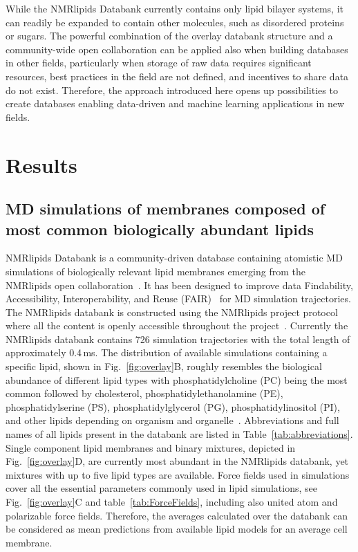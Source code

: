 \documentclass[fleqn,10pt]{wlscirep}
\begin{document}
While the NMRlipids Databank currently contains only lipid bilayer systems, it can readily be expanded to contain other molecules, such as disordered proteins or sugars. The powerful combination of the overlay databank structure and a community-wide open collaboration can be applied also when building databases in other fields, particularly when storage of raw data requires significant resources, best practices in the field are not defined, and incentives to share data do not exist. Therefore, the approach introduced here opens up possibilities to create databases enabling data-driven and machine learning applications in new fields.



\section{Results}

\subsection{MD simulations of membranes composed of most common biologically abundant lipids}

NMRlipids Databank is a community-driven database containing atomistic MD simulations of biologically relevant lipid membranes emerging from the NMRlipids open collaboration~\cite{botan15,ollila16,catte16,antila19,bacle21}. It has been designed to improve data Findability, Accessibility, Interoperability, and Reuse (FAIR)~\cite{wilkinson16} for MD simulation trajectories. The NMRlipids databank is constructed using the NMRlipids project protocol where all the content is openly accessible throughout the project~\cite{botan15}. Currently the NMRlipids databank contains 726 simulation trajectories with the total length of approximately 0.4\,ms. The distribution of available simulations containing a specific lipid, shown in Fig.~\ref{fig:overlay}B, roughly resembles the biological abundance of different lipid types with phosphatidylcholine (PC) being the most common followed by cholesterol, phosphatidylethanolamine (PE), phosphatidylserine (PS), phosphatidylglycerol (PG), phosphatidylinositol (PI), and other lipids depending on organism and organelle~\cite{vanmeer08}. Abbreviations and full names of all lipids present in the databank are listed in Table~\ref{tab:abbreviations}. Single component lipid membranes and binary mixtures, depicted in Fig.~\ref{fig:overlay}D, are currently most abundant in the NMRlipids databank, yet mixtures with up to five lipid types are available. Force fields used in simulations cover all the essential parameters commonly used in lipid simulations, see Fig.~\ref{fig:overlay}C and table~\ref{tab:ForceFields}, including also united atom and polarizable force fields. Therefore, the averages calculated over the databank can be considered as mean predictions from available lipid models for an average cell membrane.
\end{document}
